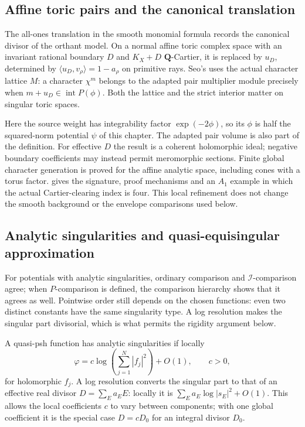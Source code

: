 \subsection{Affine toric pairs and the canonical translation}
\label{sec:ch51-affine-toric-pairs}

The all-ones translation in the smooth monomial formula records the
canonical divisor of the orthant model. On a normal affine toric
complex space with an invariant rational boundary $D$ and
$K_X+D$ $\mathbf Q$-Cartier, it is replaced by $u_D$, determined
by $\langle u_D,v_\rho\rangle=1-a_\rho$ on primitive rays.
Seo's \cite[Theorem~6.1]{Seo26ToricMultiplierV1} uses the actual
character lattice $M$: a character $\chi^m$ belongs to the adapted
pair multiplier module precisely when
$m+u_D\in\operatorname{int}P(\phi)$. Both the lattice and the
strict interior matter on singular toric spaces.

Here the source weight has integrability factor $\exp(-2\phi)$,
so its $\phi$ is half the squared-norm potential $\psi$ of this
chapter. The adapted pair volume is also part of the definition.
For effective $D$ the result is a coherent holomorphic ideal;
negative boundary coefficients may instead permit meromorphic
sections. Finite global character generation is proved for the
affine analytic space, including cones with a torus factor.
 gives the signature, proof
mechanisms and an $A_1$ example in which the actual Cartier-clearing
index is four. This local refinement does not change the smooth
background or the envelope comparisons used below.

\subsection{Analytic singularities and quasi-equisingular approximation}
\label{sec:ch51-analytic-sing}

For potentials with analytic singularities, ordinary comparison and
$\mathcal I$-comparison agree; when $P$-comparison is defined, the
comparison hierarchy shows that it agrees as well.  Pointwise order
still depends on the chosen functions: even two distinct constants have
the same singularity type.  A log resolution makes the singular part
divisorial, which is what permits the rigidity argument below.

\begin{definition}
\label{def:complex-analytic-singularities}
A quasi-psh function has analytic singularities if locally
\[
 \varphi=c\log\!\left(\sum_{j=1}^N|f_j|^2\right)+O(1),
 \qquad c>0,
\tag{51.13}\label{eq:complex-analytic-singularities}
\]
for holomorphic $f_j$.  A log resolution converts the singular part to that of an effective
real divisor $D=\sum_E a_EE$: locally it is
$\sum_Ea_E\log|s_E|^2+O(1)$.  This allows the local coefficients $c$
to vary between components; with one global coefficient it is the
special case $D=cD_0$ for an integral divisor $D_0$.
\end{definition}

